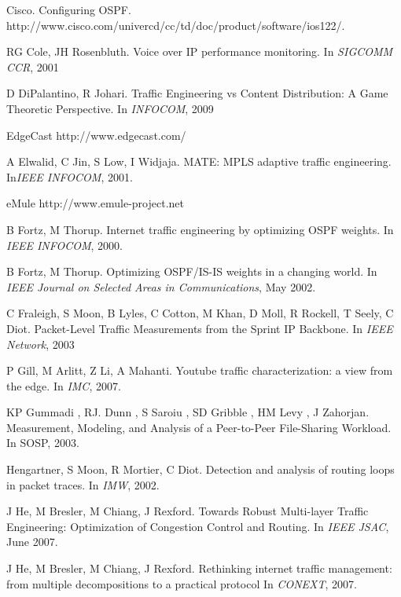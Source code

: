 \begin{thebibliography}{99}
	Cisco. Configuring OSPF.
	http://www.cisco.com/univercd/cc/td/doc/product/software/ios122/.

  	RG Cole, JH Rosenbluth.
  	Voice over IP performance monitoring.
	In \emph{SIGCOMM CCR}, 2001


	D DiPalantino, R Johari.
	Traffic Engineering vs Content Distribution: A Game Theoretic Perspective.
	 In \emph{INFOCOM}, 2009

	EdgeCast http://www.edgecast.com/



	A Elwalid, C Jin, S Low, I Widjaja.
	MATE: MPLS adaptive traffic engineering.
	In\emph{IEEE INFOCOM},
	2001.

	eMule http://www.emule-project.net


	B Fortz, M Thorup.
	Internet traffic engineering by optimizing OSPF weights.
	In \emph{IEEE INFOCOM},
	2000.

	B Fortz, M Thorup.
	Optimizing OSPF/IS-IS weights in a changing world.
	In \emph{IEEE Journal on  Selected Areas in Communications},
	May 2002.
	
	C Fraleigh, S Moon, B Lyles, C Cotton, M Khan, D Moll, R Rockell, T Seely, C Diot.
	Packet-Level Traffic Measurements from the Sprint IP Backbone.
          In \emph{IEEE Network}, 2003

	P Gill, M Arlitt, Z Li,  A Mahanti.
	Youtube traffic characterization: a view from the edge.
	In \emph{IMC}, 2007.


	KP Gummadi ,  RJ. Dunn ,  S Saroiu ,  SD Gribble ,  HM Levy ,  J Zahorjan.
	Measurement, Modeling, and Analysis of a Peer-to-Peer File-Sharing Workload.
	In {SOSP}, 2003.

	Hengartner, S Moon, R  Mortier, C Diot. 
	Detection and analysis of routing loops in packet traces. 
	In \emph{IMW}, 2002.


	J He, M Bresler, M Chiang, J Rexford.
	Towards Robust Multi-layer Traffic Engineering: Optimization of Congestion Control and Routing.
	In \emph{IEEE JSAC}, June 2007.
	
	J He, M Bresler, M Chiang, J Rexford.
	Rethinking internet traffic management: from multiple decompositions to a practical protocol
	In \emph{CONEXT}, 2007.
	

\end{thebibliography}

